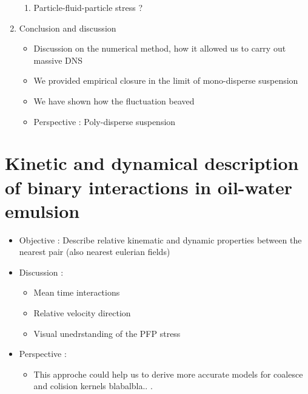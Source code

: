 \documentclass[12pt]{book}
\begin{document}
\begin{enumerate}
\begin{enumerate}
        \item Particle-fluid-particle stress ?
    \end{enumerate}
    \item Conclusion and discussion
    \begin{itemize}
        \item Discussion on the numerical method, how it allowed us to carry out massive DNS
        \item We provided empirical closure in the limit of mono-disperse suspension
        \item We have shown how the fluctuation beaved
        \item Perspective : Poly-disperse suspension
    \end{itemize}
\end{enumerate}


\section{Kinetic and dynamical description of binary interactions in oil-water emulsion}
\begin{itemize}
    \item Objective :  Describe relative kinematic and dynamic properties between the nearest pair (also nearest eulerian fields)
    \item Discussion :
    \begin{itemize}
        \item Mean time interactions
        \item Relative velocity direction 
        \item Visual unedrstanding of the PFP stress
    \end{itemize}
    \item Perspective :
    \begin{itemize}
        \item This approche could help us to derive more accurate models for coalesce and colision kernels blabalbla.. .
    \end{itemize}
\end{itemize}
\end{document}
